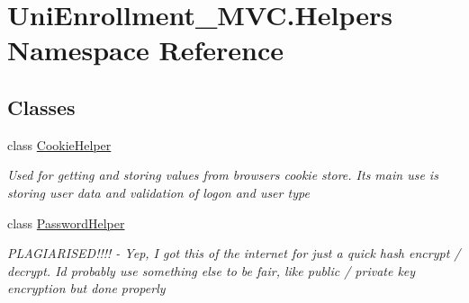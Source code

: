 \hypertarget{namespace_uni_enrollment___m_v_c_1_1_helpers}{}\section{Uni\+Enrollment\+\_\+\+M\+V\+C.\+Helpers Namespace Reference}
\label{namespace_uni_enrollment___m_v_c_1_1_helpers}
\subsection*{Classes}
\begin{DoxyCompactItemize}
\item 
class \hyperlink{class_uni_enrollment___m_v_c_1_1_helpers_1_1_cookie_helper}{Cookie\+Helper}
\begin{DoxyCompactList}\small\item\em Used for getting and storing values from browser\textquotesingle{}s cookie store. It\textquotesingle{}s main use is storing user data and validation of logon and user type \end{DoxyCompactList}\item 
class \hyperlink{class_uni_enrollment___m_v_c_1_1_helpers_1_1_password_helper}{Password\+Helper}
\begin{DoxyCompactList}\small\item\em P\+L\+A\+G\+I\+A\+R\+I\+S\+E\+D!!!! -\/ Yep, I got this of the internet for just a quick hash encrypt / decrypt. I\textquotesingle{}d probably use something else to be fair, like public / private key encryption but done properly \end{DoxyCompactList}\end{DoxyCompactItemize}
